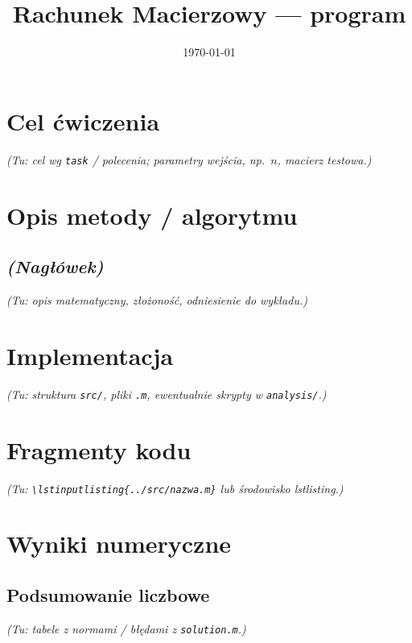 \documentclass[polish]{template/projectreport}
\title{\TytulZadania\\{\large Rachunek Macierzowy --- program \NumerProgramu}}
\author{\Autorzy}
\date{\today}
\begin{document}
\maketitle

\section{Cel ćwiczenia}
\textit{(Tu: cel wg \texttt{task} / polecenia; parametry wejścia, np.\ $n$, macierz testowa.)}

\section{Opis metody / algorytmu}
\subsection{\textit{(Nagłówek)}}
\textit{(Tu: opis matematyczny, złożoność, odniesienie do wykładu.)}

\section{Implementacja}
\textit{(Tu: struktura \texttt{src/}, pliki \texttt{.m}, ewentualnie skrypty w \texttt{analysis/}.)}

\section{Fragmenty kodu}
% 
\textit{(Tu: \texttt{\textbackslash lstinputlisting\{../src/nazwa.m\}} lub środowisko lstlisting.)}

\section{Wyniki numeryczne}

\subsection{Podsumowanie liczbowe}
\textit{(Tu: tabele z normami / błędami z \texttt{solution.m}.)}
\end{document}
